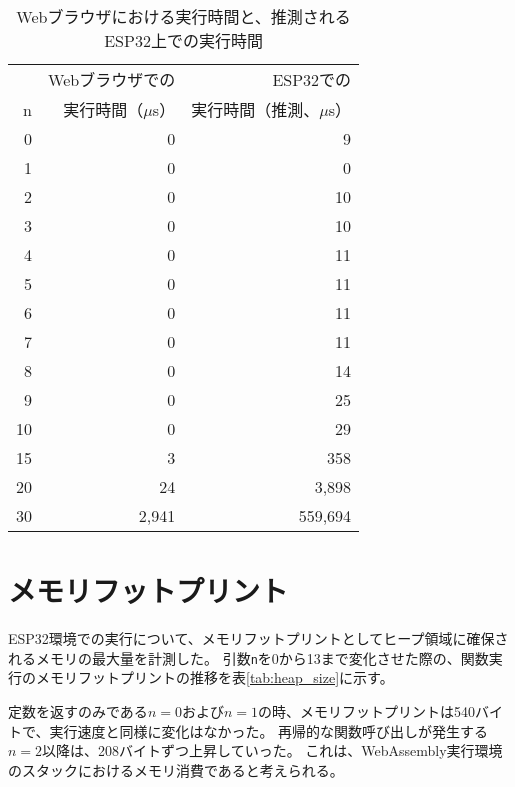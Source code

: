 \begin{table}[htbp]
  \caption{Webブラウザにおける実行時間と、推測されるESP32上での実行時間}
  \label{tab:fib_time_browser}
  \begin{center}
    \begin{tabular}{rrr}
      \hline
         & Webブラウザでの & ESP32での \\
       n & 実行時間（$\mu$s） & 実行時間（推測、$\mu$s） \\ \hline \hline
       0 &     0 &       9 \\ \hline
       1 &     0 &       0 \\ \hline
       2 &     0 &      10 \\ \hline
       3 &     0 &      10 \\ \hline
       4 &     0 &      11 \\ \hline
       5 &     0 &      11 \\ \hline
       6 &     0 &      11 \\ \hline
       7 &     0 &      11 \\ \hline
       8 &     0 &      14 \\ \hline
       9 &     0 &      25 \\ \hline
      10 &     0 &      29 \\ \hline
      15 &     3 &     358 \\ \hline
      20 &    24 &   3,898 \\ \hline
      30 & 2,941 & 559,694 \\ \hline
    \end{tabular}
  \end{center}
\end{table}

\section{メモリフットプリント}

ESP32環境での実行について、メモリフットプリントとしてヒープ領域に確保されるメモリの最大量を計測した。
引数\verb|n|を0から13まで変化させた際の、関数実行のメモリフットプリントの推移を表\ref{tab:heap_size}に示す。

定数を返すのみである$n=0$および$n=1$の時、メモリフットプリントは540バイトで、実行速度と同様に変化はなかった。
再帰的な関数呼び出しが発生する$n=2$以降は、208バイトずつ上昇していった。
これは、WebAssembly実行環境のスタックにおけるメモリ消費であると考えられる。

